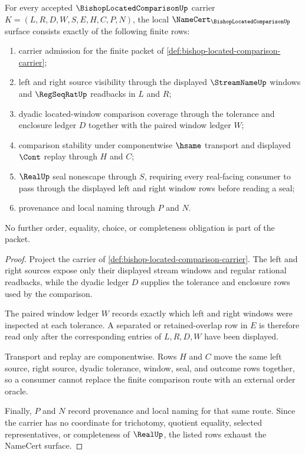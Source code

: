 \begin{theorem}
\label{thm:bishop-located-comparison-namecert-obligations}
For every accepted $\BishopLocatedComparisonUp$ carrier $K=(L,R,D,W,S,E,H,C,P,N)$, the local $\NameCert_{\BishopLocatedComparisonUp}$ surface consists exactly of the following finite rows:
\begin{enumerate}
\item carrier admission for the finite packet of \autoref{def:bishop-located-comparison-carrier};
\item left and right source visibility through the displayed $\StreamNameUp$ windows and $\RegSeqRatUp$ readbacks in $L$ and $R$;
\item dyadic located-window comparison coverage through the tolerance and enclosure ledger $D$ together with the paired window ledger $W$;
\item comparison stability under componentwise $\hsame$ transport and displayed $\Cont$ replay through $H$ and $C$;
\item $\RealUp$ seal nonescape through $S$, requiring every real-facing consumer to pass through the displayed left and right window rows before reading a seal;
\item provenance and local naming through $P$ and $N$.
\end{enumerate}
No further order, equality, choice, or completeness obligation is part of the packet.
\end{theorem}
\begin{proof}
Project the carrier of \autoref{def:bishop-located-comparison-carrier}. The left and right sources expose only their displayed stream windows and regular rational readbacks, while the dyadic ledger $D$ supplies the tolerance and enclosure rows used by the comparison.

The paired window ledger $W$ records exactly which left and right windows were inspected at each tolerance. A separated or retained-overlap row in $E$ is therefore read only after the corresponding entries of $L,R,D,W$ have been displayed.

Transport and replay are componentwise. Rows $H$ and $C$ move the same left source, right source, dyadic tolerance, window, seal, and outcome rows together, so a consumer cannot replace the finite comparison route with an external order oracle.

Finally, $P$ and $N$ record provenance and local naming for that same route. Since the carrier has no coordinate for trichotomy, quotient equality, selected representatives, or completeness of $\RealUp$, the listed rows exhaust the NameCert surface.
\end{proof}

